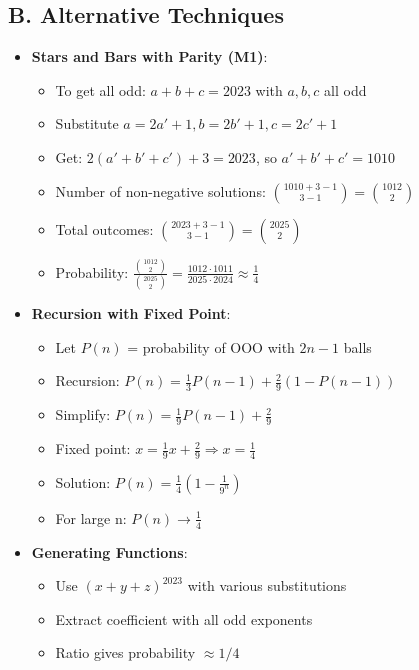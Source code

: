 \documentclass[12pt]{article}
\begin{document}
\begin{techniquesbox}
\subsection*{B. Alternative Techniques}
\begin{itemize}[leftmargin=*]
    \item \textbf{Stars and Bars with Parity (M1)}:
    \begin{itemize}
        \item To get all odd: $a + b + c = 2023$ with $a, b, c$ all odd
        \item Substitute $a = 2a' + 1, b = 2b' + 1, c = 2c' + 1$
        \item Get: $2(a' + b' + c') + 3 = 2023$, so $a' + b' + c' = 1010$
        \item Number of non-negative solutions: $\binom{1010 + 3 - 1}{3 - 1} = \binom{1012}{2}$
        \item Total outcomes: $\binom{2023 + 3 - 1}{3 - 1} = \binom{2025}{2}$
        \item Probability: $\frac{\binom{1012}{2}}{\binom{2025}{2}} = \frac{1012 \cdot 1011}{2025 \cdot 2024} \approx \frac{1}{4}$
    \end{itemize}
    \item \textbf{Recursion with Fixed Point}:
    \begin{itemize}
        \item Let $P(n)$ = probability of OOO with $2n-1$ balls
        \item Recursion: $P(n) = \frac{1}{3}P(n-1) + \frac{2}{9}(1 - P(n-1))$
        \item Simplify: $P(n) = \frac{1}{9}P(n-1) + \frac{2}{9}$
        \item Fixed point: $x = \frac{1}{9}x + \frac{2}{9} \Rightarrow x = \frac{1}{4}$
        \item Solution: $P(n) = \frac{1}{4}(1 - \frac{1}{9^n})$
        \item For large n: $P(n) \to \frac{1}{4}$
    \end{itemize}
    \item \textbf{Generating Functions}:
    \begin{itemize}
        \item Use $(x + y + z)^{2023}$ with various substitutions
        \item Extract coefficient with all odd exponents
        \item Ratio gives probability $\approx 1/4$
    \end{itemize}
\end{itemize}


\end{techniquesbox}
\end{document}
